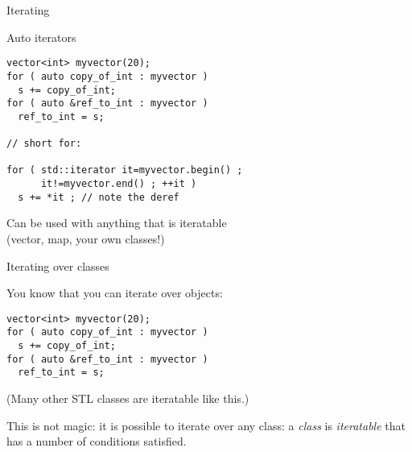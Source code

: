 \begin{comment}
  \begin{block}{Auto plus}
    \label{sl:auto-plus-const}
    Keywords like \n{const} and the reference character~\n{\&} can be
    added:
\begin{verbatim}
// class member
  some_object my_object;
// class method:
  some_object &get_some_object() { return my_object; };
// main program:
auto object_copy  = thing.get_some_object();
auto &object_mutable  = thing.get_some_object();
const auto &object_immutable  = thing.get_some_object();
\end{verbatim}
  \end{block}
\end{comment}

 {Iterating}

\begin{block}{Auto iterators}
  \label{sl:auto-iterator}
\begin{verbatim}
vector<int> myvector(20);
for ( auto copy_of_int : myvector )
  s += copy_of_int;
for ( auto &ref_to_int : myvector )
  ref_to_int = s;

// short for:

for ( std::iterator it=myvector.begin() ;
      it!=myvector.end() ; ++it )
  s += *it ; // note the deref
\end{verbatim}
Can be used with anything that is iteratable\\
(vector, map, your own classes!)
\end{block}

 {Iterating over classes}
\label{sec:range-iter}

You know that you can iterate over  objects:
\begin{verbatim}
vector<int> myvector(20);
for ( auto copy_of_int : myvector )
  s += copy_of_int;
for ( auto &ref_to_int : myvector )
  ref_to_int = s;
\end{verbatim}
(Many other \ac{STL} classes are iteratable like this.)

This is not magic: it is possible to iterate over any class:
a \emph{class} is 
\emph{iteratable} that has a number of conditions satisfied.

